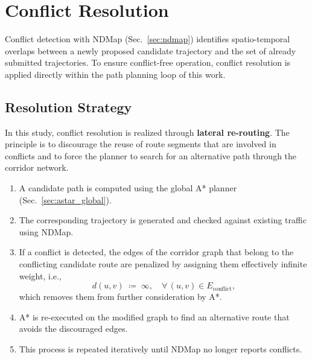 \section{Conflict Resolution}
\label{sec:conflict_resolution}

Conflict detection with NDMap (Sec.~\ref{sec:ndmap}) identifies spatio-temporal overlaps 
between a newly proposed candidate trajectory and the set of already submitted trajectories. 
To ensure conflict-free operation, conflict resolution is applied directly within the 
path planning loop of this work.

\subsection*{Resolution Strategy}
In this study, conflict resolution is realized through \textbf{lateral re-routing}. 
The principle is to discourage the reuse of route segments that are involved in conflicts 
and to force the planner to search for an alternative path through the corridor network.

\begin{enumerate}
    \item A candidate path is computed using the global A* planner (Sec.~\ref{sec:astar_global}).
    \item The corresponding trajectory is generated and checked against existing traffic using NDMap.
    \item If a conflict is detected, the edges of the corridor graph that belong to the conflicting candidate route are penalized by 
    assigning them effectively infinite weight, i.e.,
    \[
      d(u,v) \;\coloneqq\; \infty, \quad \forall\,(u,v)\in E_{\text{conflict}},
    \]
    which removes them from further consideration by A*.
    \item A* is re-executed on the modified graph to find an alternative route that avoids the discouraged edges.
    \item This process is repeated iteratively until NDMap no longer reports conflicts.
\end{enumerate}

